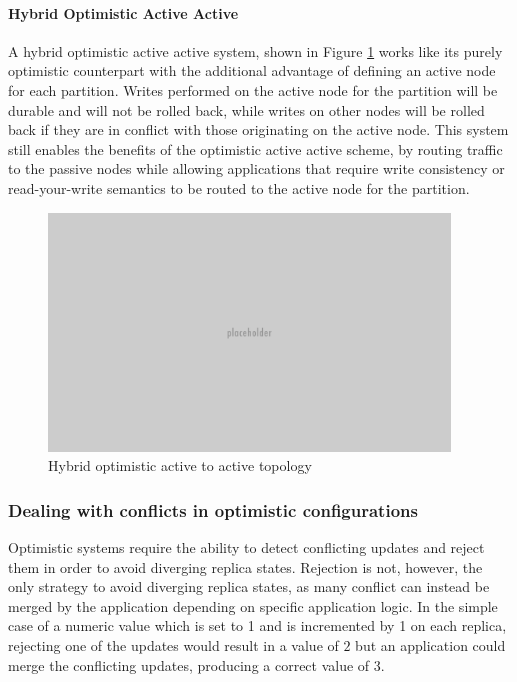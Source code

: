 \paragraph{Hybrid Optimistic Active Active}
A hybrid optimistic active active system, shown in Figure \ref{fig:hybrid-optimistic-active-active} works like its purely optimistic counterpart with the additional advantage of defining an active node for each partition.
Writes performed on the active node for the partition will be durable and will not be rolled back, while writes on other nodes will be rolled back if they are in conflict with those originating on the active node.
This system still enables the benefits of the optimistic active active scheme, by routing traffic to the passive nodes while allowing applications that require write consistency or read-your-write semantics to be routed to the active node for the partition.

\begin{figure}[h]
\caption{Hybrid optimistic active to active topology}
\label{fig:hybrid-optimistic-active-active}
\centering
\includegraphics[width=0.95\textwidth]{images/placeholder.png}
\end{figure}


\subsubsection{Dealing with conflicts in optimistic configurations}
Optimistic systems require the ability to detect conflicting updates and reject them in order to avoid diverging replica states.
Rejection is not, however, the only strategy to avoid diverging replica states, as many conflict can instead be merged by the application depending on specific application logic.
In the simple case of a numeric value which is set to 1 and is incremented by 1 on each replica, rejecting one of the updates would result in a value of $2$ but an application could merge the conflicting updates, producing a correct value of 3.

